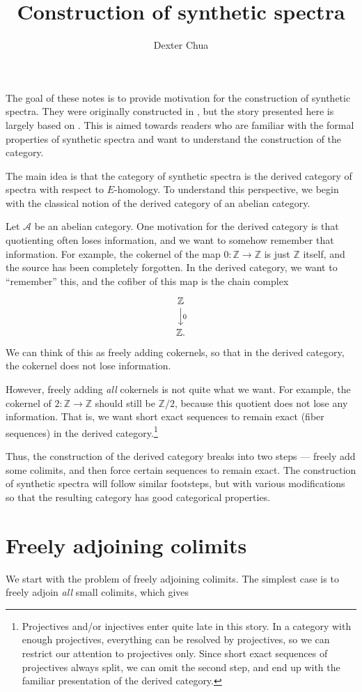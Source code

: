 \documentclass{shortart}
\title{Construction of synthetic spectra}
\author{Dexter Chua}
\theoremstyle{definition}
\newcommand\Z{{\mathbb{Z}}}
\begin{document}
The goal of these notes is to provide motivation for the construction of synthetic spectra. They were originally constructed in \cite{synthetic}, but the story presented here is largely based on \cite{algebraicity}. This is aimed towards readers who are familiar with the formal properties of synthetic spectra and want to understand the construction of the category.

The main idea is that the category of synthetic spectra is the derived category of spectra with respect to $E$-homology. To understand this perspective, we begin with the classical notion of the derived category of an abelian category.

Let $\mathcal{A}$ be an abelian category. One motivation for the derived category is that quotienting often loses information, and we want to somehow remember that information. For example, the cokernel of the map $0\colon \Z \to \Z$ is just $\Z$ itself, and the source has been completely forgotten. In the derived category, we want to ``remember'' this, and the cofiber of this map is the chain complex
\[
  \begin{tikzcd}
    \Z \ar[d, "0"] \\
    \Z.
  \end{tikzcd}
\]
We can think of this as freely adding cokernels, so that in the derived category, the cokernel does not lose information.

However, freely adding \emph{all} cokernels is not quite what we want. For example, the cokernel of $2 \colon \Z \to \Z$ should still be $\Z/2$, because this quotient does not lose any information. That is, we want short exact sequences to remain exact (fiber sequences) in the derived category.\footnote{Projectives and/or injectives enter quite late in this story. In a category with enough projectives, everything can be resolved by projectives, so we can restrict our attention to projectives only. Since short exact sequences of projectives always split, we can omit the second step, and end up with the familiar presentation of the derived category.}

Thus, the construction of the derived category breaks into two steps --- freely add some colimits, and then force certain sequences to remain exact. The construction of synthetic spectra will follow similar footsteps, but with various modifications so that the resulting category has good categorical properties.

\section{Freely adjoining colimits}
We start with the problem of freely adjoining colimits. The simplest case is to freely adjoin \emph{all} small colimits, which gives
\end{document}
